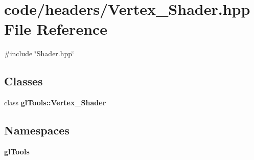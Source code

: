 \section{code/headers/\+Vertex\+\_\+\+Shader.hpp File Reference}
\label{_vertex___shader_8hpp}
{\ttfamily \#include \char`\"{}Shader.\+hpp\char`\"{}}\newline
\subsection*{Classes}
\begin{DoxyCompactItemize}
\item 
class \textbf{ gl\+Tools\+::\+Vertex\+\_\+\+Shader}
\end{DoxyCompactItemize}
\subsection*{Namespaces}
\begin{DoxyCompactItemize}
\item 
 \textbf{ gl\+Tools}
\end{DoxyCompactItemize}
